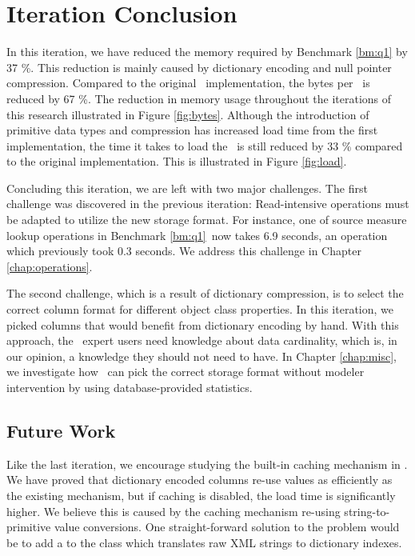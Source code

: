 \section{Iteration Conclusion}
\label{sec:Iteration Conclusion}
In this iteration, we have reduced the memory required by Benchmark \ref{bm:q1} by 37 \%. This reduction is mainly caused by dictionary encoding and null pointer compression. Compared to the original \gap~implementation, the bytes per \lineitem~is reduced by 67 \%. The reduction in memory usage throughout the iterations of this research illustrated in Figure \ref{fig:bytes}. Although the introduction of primitive data types and compression has increased load time from the first  implementation, the time it takes to load the \tpchdl~is still reduced by 33 \% compared to the original implementation. This is illustrated in Figure \ref{fig:load}.

Concluding this iteration, we are left with two major challenges. The first challenge was discovered in the previous iteration: Read-intensive operations must be adapted to utilize the new storage format. For instance, one of source measure lookup operations in Benchmark \ref{bm:q1}~now takes 6.9 seconds, an operation which previously took 0.3 seconds. We address this challenge in Chapter \ref{chap:operations}.

The second challenge, which is a result of dictionary compression, is to select the correct column format for different object class properties. In this iteration, we picked columns that would benefit from dictionary encoding by hand. With this approach, the \gap~expert users need knowledge about data cardinality, which is, in our opinion, a knowledge they should not need to have. In Chapter \ref{chap:misc}, we investigate how \gap~can pick the correct storage format without modeler intervention by using database-provided statistics.

\subsection{Future Work}
\label{compression:future-work}
Like the last iteration, we encourage studying the built-in caching mechanism in \gap. We have proved that dictionary encoded columns re-use values as efficiently as the existing mechanism, but if caching is disabled, the load time is significantly higher. We believe this is caused by the caching mechanism re-using string-to-primitive value conversions. One straight-forward solution to the problem would be to add a  to the  class which translates raw XML strings to dictionary indexes.

